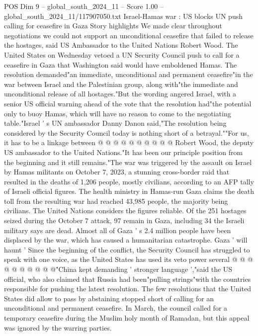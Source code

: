 \begin{textsample}{POS Dim 9 – global\_south\_2024\_11 – Score 1.00 – global\_south\_2024\_11/117907050.txt}  \label{ex:f9_pos_150}
Israel-Hamas war : US blocks UN push calling for ceasefire in Gaza Story highlights We made clear throughout negotiations we could not support an unconditional ceasefire that failed to release the hostages, said US Ambassador to the United Nations Robert Wood.
The United States on Wednesday vetoed a UN Security Council push to call for a ceasefire in Gaza that Washington said would have emboldened Hamas.
The resolution demanded"an immediate, unconditional and permanent ceasefire"in the war between Israel and the Palestinian group, along with"the immediate and unconditional release of all hostages."But the wording angered Israel, with a senior US official warning ahead of the vote that the resolution had"the potential only to buoy Hamas, which will have no reason to come to the negotiating table."Israel ' s UN ambassador Danny Danon said,"The resolution being considered by the Security Council today is nothing short of a betrayal.""For us, it has to be a linkage between @ @ @ @ @ @ @ @ @ @ Robert Wood, the deputy US ambassador to the United Nations."It has been our principle position from the beginning and it still remains."The war was triggered by the assault on Israel by Hamas militants on October 7, 2023, a stunning cross-border raid that resulted in the deaths of 1,206 people, mostly civilians, according to an AFP tally of Israeli official figures.
The health ministry in Hamas-run Gaza claims the death toll from the resulting war had reached 43,985 people, the majority being civilians.
The United Nations considers the figures reliable.
Of the 251 hostages seized during the October 7 attack, 97 remain in Gaza, including 34 the Israeli military says are dead.
Almost all of Gaza ' s 2.4 million people have been displaced by the war, which has caused a humanitarian catastrophe.
Gaza ' will haunt ' Since the beginning of the conflict, the Security Council has struggled to speak with one voice, as the United States has used its veto power several @ @ @ @ @ @ @ @ @ @"China kept demanding ' stronger language ',"said the US official, who also claimed that Russia had been"pulling strings"with the countries responsible for pushing the latest resolution.
The few resolutions that the United States did allow to pass by abstaining stopped short of calling for an unconditional and permanent ceasefire.
In March, the council called for a temporary ceasefire during the Muslim holy month of Ramadan, but this appeal was ignored by the warring parties.

\end{textsample}
